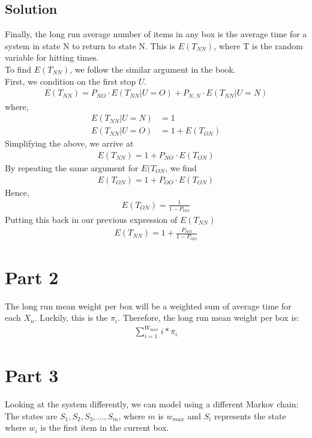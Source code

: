 \documentclass[10pt,a4paper]{article}
\begin{document}
\subsection*{Solution}
Finally, the long run average number of items in any box is the average time for a system in state N to return to state N. This is $ E(T_{NN}) $, where T is the random variable for hitting times. \\
To find $ E(T_{NN}) $, we follow the similar argument in the book. \\
First, we condition on the first stop $ U $. 
\begin{align*}
E(T_{NN}) = P_{NO}\cdot E(T_{NN}|U=O)+P_{N,N}\cdot E(T_{NN}|U=N)
\end{align*}
where,\\
\begin{align*}
E(T_{NN}|U=N) &= 1 \\
E(T_{NN}|U=O) &= 1+E(T_{ON})
\end{align*}
Simplifying the above, we arrive at\\
\begin{align*}
E(T_{NN}) = 1+ P_{NO}\cdot E(T_{ON})
\end{align*}
By repeating the same argument for $ E(T_{ON} $, we find \\
\begin{align*}
E(T_{ON}) = 1+ P_{OO}\cdot E(T_{ON})
\end{align*}
Hence, 
\begin{align*}
E(T_{ON}) = \frac{1}{1 - P_{OO}}
\end{align*}
Putting this back in our previous expression of $ E(T_{NN}) $
\begin{align*}
E(T_{NN}) = 1+ \frac{P_{NO}}{1 - P_{OO}}
\end{align*}


\section{Part 2}
The long run mean weight per box will be a weighted sum of average time for each $X_n$. Luckily, this is the $\pi_i$. Therefore, the long run mean weight per box is:
\begin{align*}
\sum_{i=1}^{W_{max}} i*\pi_i
\end{align*}


\section{Part 3}
Looking at the system differently, we can model using a different Markov chain:\\
The states are $ S_1, S_2, S_3, ..., S_m$, where $m$ is $w_{max}$ and $S_i$ represents the state where $w_i$ is the first item in the current box.\\
\end{document}
